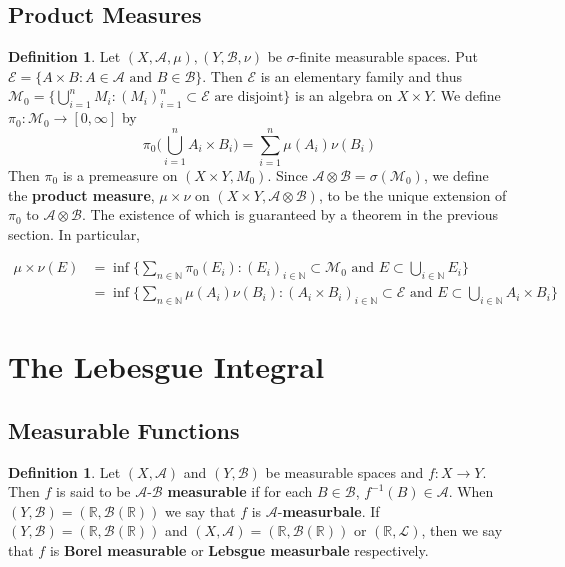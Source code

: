 \documentclass[12pt]{amsart}
\theoremstyle{definition}
\newtheorem{defn}[definition]{Definition}
\newcommand{\sig}{\sigma}
\newcommand{\N}{\mathbb{N}}
\newcommand{\R}{\mathbb{R}}
\newcommand{\MA}{\mathcal{A}}
\newcommand{\MB}{\mathcal{B}}
\newcommand{\ML}{\mathcal{L}}
\newcommand{\ME}{\mathcal{E}}
\newcommand{\MM}{\mathcal{M}}
\newcommand{\RG}{[0,\infty]}
\begin{document}
	
	
	\subsection{Product Measures}
	
	\begin{defn}
		Let $(X,\MA, \mu), (Y,\MB, \nu)$ be $\sig$-finite measurable spaces. Put $\ME = \{A \times B: A \in \MA \text{ and } B \in \MB\}$. Then $\ME$ is an elementary family and thus $\MM_0 = \{\bigcup_{i =1}^n M_i: (M_i)_{i=1 }^n \subset \ME \text{ are disjoint}\}$ is an algebra on $X \times Y$. We define $\pi_0: \MM_0 \rightarrow \RG$ by $$\pi_0\bigg(\bigcup_{i=1}^n A_i \times B_i \bigg) = \sum_{i=1}^n\mu(A_i)\nu(B_i)$$ Then $\pi_0$ is a premeasure on $(X \times Y, M_0)$. Since $\MA \otimes \MB = \sig(\MM_0)$, we define the \textbf{product measure}, $\mu \times \nu$ on $(X \times Y, \MA \otimes \MB)$, to be the unique extension of $\pi_0$ to $\MA \otimes \MB$. The existence of which is guaranteed by a theorem in the previous section. In particular,
		
		\begin{align*}
			\mu \times \nu(E) 
			&= \inf \bigg\{\sum_{n \in \N}\pi_0(E_i): (E_i)_{i \in \N} \subset \MM_0 \text{ and } E \subset \bigcup_{i \in \N} E_i \bigg\}\\
			&= \inf \bigg\{\sum_{n \in \N}\mu(A_i)\nu(B_i): (A_i \times B_i)_{i \in \N} \subset \ME \text{ and } E \subset \bigcup_{i \in \N} A_i \times B_i \bigg \}
		\end{align*}
	\end{defn}
	
	\section{The Lebesgue Integral}
	
	\subsection{Measurable Functions}
	
	\begin{defn}
		Let $(X,\MA)$ and $(Y, \MB)$ be measurable spaces and $f:X \rightarrow Y$. Then $f$ is said to be $\MA$-$\MB$ \textbf{measurable} if for each $B \in \MB$, $f^{-1}(B) \in \MA$. When $(Y, \MB) = (\R, \MB(\R))$ we say that $f$ is $\MA$-\textbf{measurbale}. If $(Y,\MB) = (\R, \MB(\R))$ and $(X,\MA) = (\R, \MB(\R))$ or $(\R, \ML)$, then we say that $f$ is \textbf{Borel measurable} or \textbf{Lebsgue measurbale} respectively.
	\end{defn}
	
\end{document}
